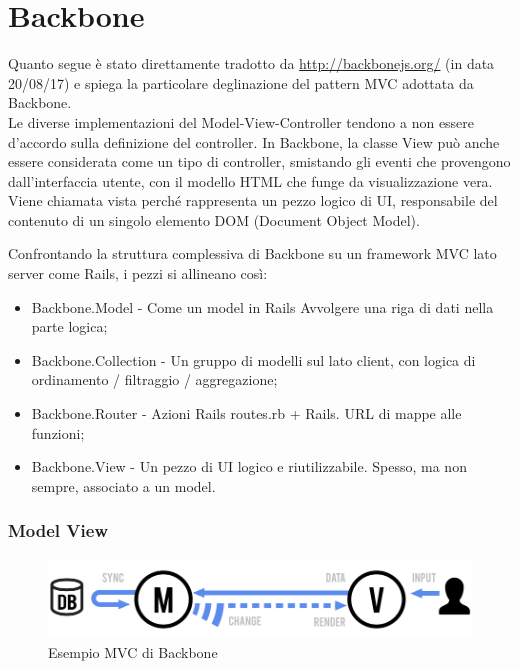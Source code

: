 \documentclass[../SpecificaTecnica.tex]{subfiles}
\begin{document}
	\section{Backbone}
Quanto segue è stato direttamente tradotto da \url{http://backbonejs.org/} (in data 20/08/17) e spiega la particolare deglinazione del pattern MVC adottata da Backbone.
\\
Le diverse implementazioni del Model-View-Controller tendono a non essere d'accordo sulla definizione del controller.
In Backbone, la classe View può anche essere considerata come un tipo di controller, smistando gli eventi che provengono dall'interfaccia utente, con il modello HTML che funge da visualizzazione vera.
Viene chiamata vista perché rappresenta un pezzo logico di UI, responsabile del contenuto di un singolo elemento DOM (Document Object Model).

Confrontando la struttura complessiva di Backbone su un framework MVC lato server come Rails, i pezzi si allineano così:
\begin{itemize}
 
	\item Backbone.Model - Come un model in Rails Avvolgere una riga di dati nella parte logica;
\item Backbone.Collection - Un gruppo di modelli sul lato client, con logica di ordinamento / filtraggio / aggregazione;
\item Backbone.Router - Azioni Rails routes.rb + Rails. URL di mappe alle funzioni;
\item Backbone.View - Un pezzo di UI logico e riutilizzabile. Spesso, ma non sempre, associato a un model.\\
\end{itemize}
\subsubsection{Model View}
	\begin{figure}[H] \label{fig:Singleton}
		\centering
		\includegraphics[scale=0.4]{Immagini/intro-model-view.png}
		\caption{Esempio MVC di Backbone}
	\end{figure}
\end{document}
